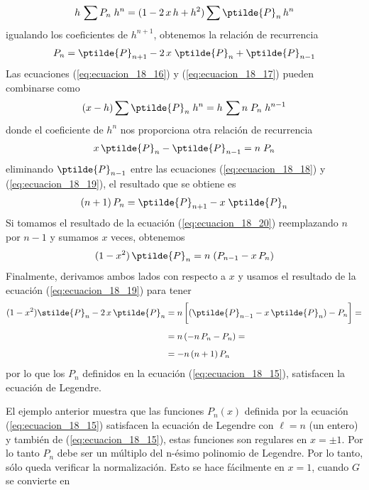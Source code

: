 \begin{align*}
h \, \sum P_{n} \; h^{n} =  (1 - 2 \, x \, h + h^{2}) \sum \ptilde{P}_{n} \, h^{n}
\end{align*}
igualando los coeficientes de $h^{n+1}$, obtenemos la relación de recurrencia
\begin{align}
P_{n} = \ptilde{P}_{n+1} - 2 \, x \; \ptilde{P}_{n} + \ptilde{P}_{n-1}
\label{eq:ecuacion_18_18}
\end{align}
Las ecuaciones (\ref{eq:ecuacion_18_16}) y (\ref{eq:ecuacion_18_17}) pueden combinarse como
\begin{align*}
(x - h) \sum \ptilde{P}_{n} \; h^{n} = h \, \sum n \; P_{n} \; h^{n-1}
\end{align*}
donde el coeficiente de $h^{n}$ nos proporciona otra relación de recurrencia
\begin{align}
x \, \ptilde{P}_{n} - \ptilde{P}_{n-1} =  n \; P_{n}
\label{eq:ecuacion_18_19}
\end{align}
eliminando $\ptilde{P}_{n-1}$ entre las ecuaciones (\ref{eq:ecuacion_18_18}) y (\ref{eq:ecuacion_18_19}), el resultado que se obtiene es
\begin{align}
(n + 1) \, P_{n} = \ptilde{P}_{n+1} - x \; \ptilde{P}_{n}
\label{eq:ecuacion_18_20}
\end{align}
Si tomamos el resultado de la ecuación (\ref{eq:ecuacion_18_20}) reemplazando $n$ por $n-1$ y sumamos $x$ veces, obtenemos
\begin{equation}
(1 - x^{2}) \, \ptilde{P}_{n} = n \; (P_{n-1} - x \, P_{n})
\label{eq:ecuacion_18_21}
\end{equation}
Finalmente, derivamos ambos lados con respecto a $x$ y usamos el resultado de la ecuación (\ref{eq:ecuacion_18_19}) para tener
\begin{align*}
(1 - x^{2}) \stilde{P}_{n} - 2 \, x \, \ptilde{P}_{n} &= n \, \bigg[ (\ptilde{P}_{n-1} - x \, \ptilde{P}_{n}) - P_{n} \bigg] = \\[0.5em]
&= n \, (-n \, P_{n} - P_{n}) = \\[0.5em]
&= -n \, (n + 1) \, P_{n}
\end{align*}
por lo que los $P_{n}$ definidos en la ecuación (\ref{eq:ecuacion_18_15}), satisfacen la ecuación de Legendre.
\par
El ejemplo anterior muestra que las funciones $P_{n} (x)$ definida por la ecuación (\ref{eq:ecuacion_18_15}) satisfacen la ecuación de Legendre con $\ell = n$ (un entero) y también de (\ref{eq:ecuacion_18_15}), estas funciones son regulares en $x = \pm 1$. Por lo tanto $P_{n}$ debe ser un múltiplo del n-ésimo polinomio de Legendre. Por lo tanto, sólo queda verificar la normalización. Esto se hace fácilmente en $x = 1$, cuando $G$ se convierte en
